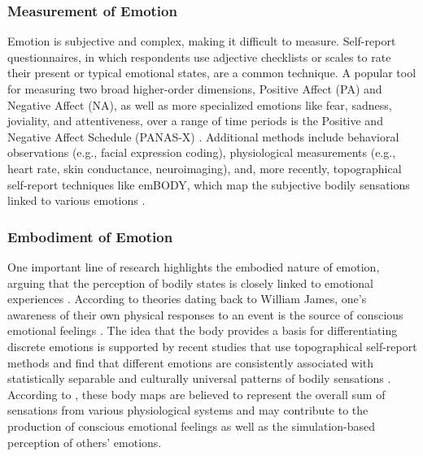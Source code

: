 \documentclass{DESSThesis}
\begin{document}
\subsubsection{Measurement of Emotion}
Emotion is subjective and complex, making it difficult to measure. Self-report questionnaires, in which respondents use adjective checklists or scales to rate their present or typical emotional states, are a common technique. A popular tool for measuring two broad higher-order dimensions, Positive Affect (PA) and Negative Affect (NA), as well as more specialized emotions like fear, sadness, joviality, and attentiveness, over a range of time periods is the Positive and Negative Affect Schedule (PANAS-X) \cite{david_watson_panas-x_1994}. Additional methods include behavioral observations (e.g., facial expression coding), physiological measurements (e.g., heart rate, skin conductance, neuroimaging), and, more recently, topographical self-report techniques like emBODY, which map the subjective bodily sensations linked to various emotions \cite{nummenmaa_bodily_2014,paul_towards_2020}.

\subsubsection{Embodiment of Emotion}
One important line of research highlights the embodied nature of emotion, arguing that the perception of bodily states is closely linked to emotional experiences \cite{nummenmaa_bodily_2014}. According to theories dating back to William James, one's awareness of their own physical responses to an event is the source of conscious emotional feelings \cite{paul_towards_2020}. The idea that the body provides a basis for differentiating discrete emotions is supported by recent studies that use topographical self-report methods and find that different emotions are consistently associated with statistically separable and culturally universal patterns of bodily sensations \cite{nummenmaa_bodily_2014}. According to \cite{nummenmaa_bodily_2014}, these body maps are believed to represent the overall sum of sensations from various physiological systems and may contribute to the production of conscious emotional feelings as well as the simulation-based perception of others' emotions.
\end{document}
